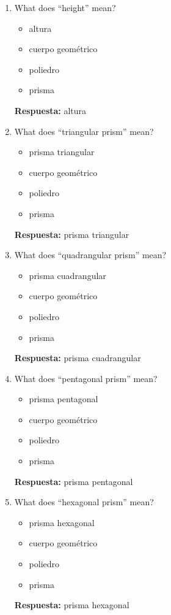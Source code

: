 \documentclass[11pt,a4paper]{article}
\begin{document}
\begin{enumerate}
\begin{itemize}
\item bases
\item cuerpo geométrico
\item poliedro
\item prisma
\end{itemize}
\textbf{Respuesta:} bases
\item What does ``height'' mean?
\begin{itemize}
\item altura
\item cuerpo geométrico
\item poliedro
\item prisma
\end{itemize}
\textbf{Respuesta:} altura
\item What does ``triangular prism'' mean?
\begin{itemize}
\item prisma triangular
\item cuerpo geométrico
\item poliedro
\item prisma
\end{itemize}
\textbf{Respuesta:} prisma triangular
\item What does ``quadrangular prism'' mean?
\begin{itemize}
\item prisma cuadrangular
\item cuerpo geométrico
\item poliedro
\item prisma
\end{itemize}
\textbf{Respuesta:} prisma cuadrangular
\item What does ``pentagonal prism'' mean?
\begin{itemize}
\item prisma pentagonal
\item cuerpo geométrico
\item poliedro
\item prisma
\end{itemize}
\textbf{Respuesta:} prisma pentagonal
\item What does ``hexagonal prism'' mean?
\begin{itemize}
\item prisma hexagonal
\item cuerpo geométrico
\item poliedro
\item prisma
\end{itemize}
\textbf{Respuesta:} prisma hexagonal

\end{enumerate}
\end{document}
